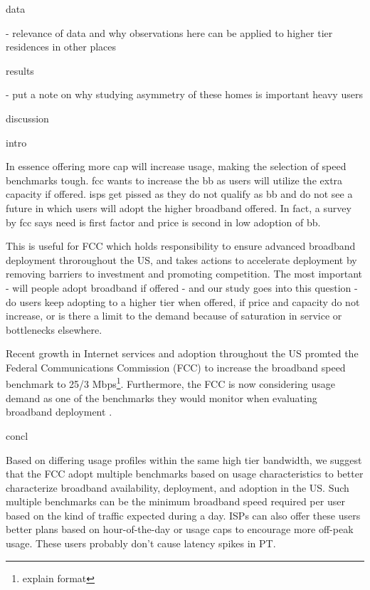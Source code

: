 data

- relevance of data and why observations here can be applied to higher tier residences in other places


results

- put a note on why studying asymmetry of these homes is important heavy users


discussion


intro

In essence offering more cap will increase usage, making the selection of speed benchmarks tough. fcc wants to increase the bb as users will utilize the extra capacity if offered. isps get pissed as they do not qualify as bb and do not see a future in which users will adopt the higher broadband offered. In fact, a survey by fcc says need is first factor and price is second in low adoption of bb.

This is useful for FCC which holds responsibility to ensure advanced broadband deployment throroughout the US, and takes actions to accelerate deployment by removing barriers to investment and promoting competition. The most important - will people adopt broadband if offered - and our study goes into this question - do users keep adopting to a higher tier when offered, if price and capacity do not increase, or is there a limit to the demand because of saturation in service or bottlenecks elsewhere.

Recent growth in Internet services and adoption throughout the US promted the Federal Communications Commission (FCC) to increase the broadband speed benchmark to 25/3 Mbps\footnote{explain format}. Furthermore, the FCC is now considering usage demand as one of the benchmarks they would monitor when evaluating broadband deployment \cite{fcc2015broadband-report}.


concl


Based on differing usage profiles within the same high tier bandwidth, we suggest that the FCC adopt multiple benchmarks based on usage characteristics to better characterize broadband availability, deployment, and adoption in the US. Such multiple benchmarks can be the minimum broadband speed required per user based on the kind of traffic expected during a day. ISPs can also offer these users better plans based on hour-of-the-day or usage caps to encourage more off-peak usage. These users probably don't cause latency spikes in PT.